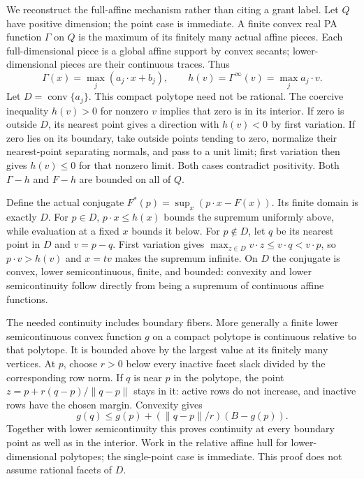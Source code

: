 \documentclass[
  11pt,
]{article}
\begin{document}
We reconstruct the full-affine mechanism rather than citing a grant
label. Let \(Q\) have positive dimension; the point case is immediate. A
finite convex real PA function \(\Gamma\) on \(Q\) is the maximum of its
finitely many actual affine pieces. Each full-dimensional piece is a
global affine support by convex secants; lower-dimensional pieces are
their continuous traces. Thus \[ \Gamma(x)=\max_j(a_j\cdot x+b_j),\qquad
h(v)=\Gamma^\infty(v)=\max_j a_j\cdot v. \] Let
\(D=\operatorname{conv}\{a_j\}\). This compact polytope need not be
rational. The coercive inequality \(h(v)>0\) for nonzero \(v\) implies
that zero is in its interior. If zero is outside \(D\), its nearest
point gives a direction with \(h(v)<0\) by first variation. If zero lies
on its boundary, take outside points tending to zero, normalize their
nearest-point separating normals, and pass to a unit limit; first
variation then gives \(h(v)\leq0\) for that nonzero limit. Both cases
contradict positivity. Both \(\Gamma-h\) and \(F-h\) are bounded on all
of \(Q\).

Define the actual conjugate \(F^*(p)=\sup_x(p\cdot x-F(x))\). Its finite
domain is exactly \(D\). For \(p\in D\), \(p\cdot x\leq h(x)\) bounds
the supremum uniformly above, while evaluation at a fixed \(x\) bounds
it below. For \(p\notin D\), let \(q\) be its nearest point in \(D\) and
\(v=p-q\). First variation gives
\(\max_{z\in D}v\cdot z\leq v\cdot q<v\cdot p\), so \(p\cdot v>h(v)\)
and \(x=t v\) makes the supremum infinite. On \(D\) the conjugate is
convex, lower semicontinuous, finite, and bounded: convexity and lower
semicontinuity follow directly from being a supremum of continuous
affine functions.

The needed continuity includes boundary fibers. More generally a finite
lower semicontinuous convex function \(g\) on a compact polytope is
continuous relative to that polytope. It is bounded above by the largest
value at its finitely many vertices. At \(p\), choose \(r>0\) below
every inactive facet slack divided by the corresponding row norm. If
\(q\) is near \(p\) in the polytope, the point \(z=p+r(q-p)/\|q-p\|\)
stays in it: active rows do not increase, and inactive rows have the
chosen margin. Convexity gives \[ g(q)\leq g(p)+(\|q-p\|/r)(B-g(p)). \]
Together with lower semicontinuity this proves continuity at every
boundary point as well as in the interior. Work in the relative affine
hull for lower-dimensional polytopes; the single-point case is
immediate. This proof does not assume rational facets of \(D\).
\end{document}
